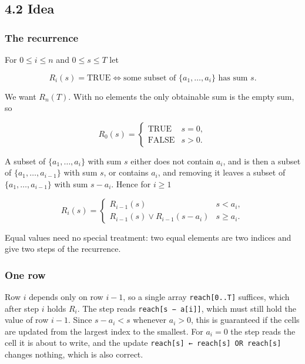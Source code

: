 \documentclass[
]{article}
\begin{document}
\hypertarget{idea-2}{%
\subsection{4.2 Idea}\label{idea-2}}

\hypertarget{the-recurrence}{%
\subsubsection{The recurrence}\label{the-recurrence}}

For \(0 \le i \le n\) and \(0 \le s \le T\) let

\[
R_i(s) = \text{TRUE} \iff \text{some subset of } \lbrace a_1, \dots, a_i \rbrace \text{ has sum } s .
\]

We want \(R_n(T)\). With no elements the only obtainable sum is the
empty sum, so

\[
R_0(s) = \begin{cases} \text{TRUE} & s = 0, \\ \text{FALSE} & s > 0. \end{cases}
\]

A subset of \(\lbrace a_1, \dots, a_i \rbrace\) with sum \(s\) either
does not contain \(a_i\), and is then a subset of
\(\lbrace a_1, \dots, a_{i-1} \rbrace\) with sum \(s\), or contains
\(a_i\), and removing it leaves a subset of
\(\lbrace a_1, \dots, a_{i-1} \rbrace\) with sum \(s - a_i\). Hence for
\(i \ge 1\)

\[
R_i(s) = \begin{cases} R_{i-1}(s) & s < a_i, \\ R_{i-1}(s) \lor R_{i-1}(s - a_i) & s \ge a_i. \end{cases}
\]

Equal values need no special treatment: two equal elements are two
indices and give two steps of the recurrence.

\hypertarget{one-row}{%
\subsubsection{One row}\label{one-row}}

Row \(i\) depends only on row \(i - 1\), so a single array
\texttt{reach{[}0..T{]}} suffices, which after step \(i\) holds \(R_i\).
The step reads \texttt{reach{[}s\ −\ a{[}i{]}{]}}, which must still hold
the value of row \(i - 1\). Since \(s - a_i < s\) whenever \(a_i > 0\),
this is guaranteed if the cells are updated from the largest index to
the smallest. For \(a_i = 0\) the step reads the cell it is about to
write, and the update
\texttt{reach{[}s{]}\ ←\ reach{[}s{]}\ OR\ reach{[}s{]}} changes
nothing, which is also correct.
\end{document}
